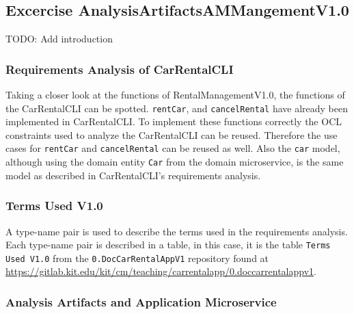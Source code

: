 \subsection{Excercise AnalysisArtifactsAMMangementV1.0}
TODO: Add introduction
\subsubsection*{Requirements Analysis of CarRentalCLI}
Taking a closer look at the functions of RentalManagementV1.0, the functions of the CarRentalCLI can be spotted.
\texttt{rentCar}, and \texttt{cancelRental} have already been implemented in CarRentalCLI.
To implement these functions correctly the OCL constraints used to analyze the CarRentalCLI can be reused.
Therefore the use cases for \texttt{rentCar} and \texttt{cancelRental} can be reused as well.
Also the \texttt{car} model, although using the domain entity \texttt{Car} from the domain microservice, is the same model as described in CarRentalCLI's requirements analysis.
\subsubsection*{Terms Used V1.0}
A type-name pair is used to describe the terms used in the requirements analysis.
Each type-name pair is described in a table, in this case, it is the table \texttt{Terms Used V1.0} from the \texttt{0.DocCarRentalAppV1} repository found at \url{https://gitlab.kit.edu/kit/cm/teaching/carrentalapp/0.doccarrentalappv1}.

\subsubsection*{Analysis Artifacts and Application Microservice}
